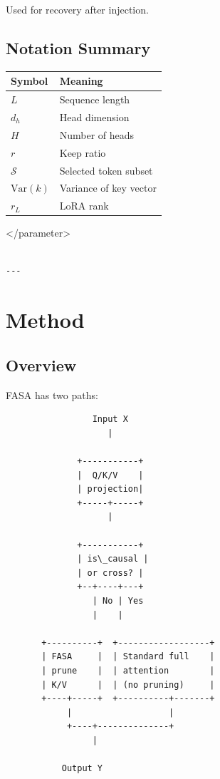 Used for recovery after injection.

\subsection{Notation Summary}

\begin{table}[H]
\centering
\small
\begin{tabular}{ll}
\toprule
\textbf{Symbol} & \textbf{Meaning} \\
\midrule
$L$ & Sequence length \\
$d_h$ & Head dimension \\
$H$ & Number of heads \\
$r$ & Keep ratio \\
$\mathcal{S}$ & Selected token subset \\
$\text{Var}(k)$ & Variance of key vector \\
$r_L$ & LoRA rank \\
\bottomrule
\end{tabular}
\end{table}
\textless{}/parameter\textgreater{}
\begin{lstlisting}

---
\end{lstlisting}


\section{Method}

\subsection{Overview}

FASA has two paths:

\begin{lstlisting}
                 Input X
                    |
                     
              +-----------+
              |  Q/K/V    |
              | projection|
              +-----+-----+
                    |
                     
              +-----------+
              | is\_causal |
              | or cross? |
              +--+----+---+
                 | No | Yes
                 |    |
                       
       +----------+  +------------------+
       | FASA     |  | Standard full    |
       | prune    |  | attention        |
       | K/V      |  | (no pruning)     |
       +----+-----+  +----------+-------+
            |                   |
            +----+--------------+
                 |
                  
           Output Y
\end{lstlisting}

